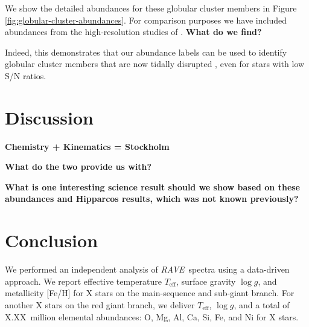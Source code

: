 \documentclass[preprint,trackchanges]{aastex}
\newcommand{\acronym}[1]{{\small{#1}}}
\newcommand{\project}[1]{\textsl{#1}}
\newcommand{\rave}{\project{\acronym{RAVE}}}
\newcommand{\stub}[1]{{\color{blue} \textbf{#1}}}
\newcommand{\teff}{T_{\mathrm{eff}}}
\newcommand{\logg}{\log g}
\begin{document}
We show the detailed abundances for these globular cluster members in
Figure \ref{fig:globular-cluster-abundances}.  For comparison purposes we
have included abundances from the high-resolution studies of \citep{people}.
\stub{What do we find?}

Indeed, this demonstrates that our abundance labels can be used to identify
globular cluster members that are now tidally disrupted \citep{Anguiano_2016,Kuzma_2016,Navin_2016},
even for stars with low S/N ratios.







\section{Discussion}
\label{sec:discussion}


\stub{Chemistry + Kinematics = Stockholm}

\stub{What do the two provide us with?}

\stub{What is one interesting science result should we show based on these abundances and Hipparcos results, which was not known previously?}


\section{Conclusion}
\label{sec:conclusion}

We performed an independent analysis of \rave\ spectra using a data-driven approach.
We report effective temperature $\teff$, surface gravity $\logg$, and metallicity [Fe/H]
for X stars on the main-sequence and sub-giant branch.  For another X stars on the red
giant branch, we deliver $\teff$, $\logg$, and a total of X.XX~million elemental abundances:
O, Mg, Al, Ca, Si, Fe, and Ni for X stars.  
\end{document}
